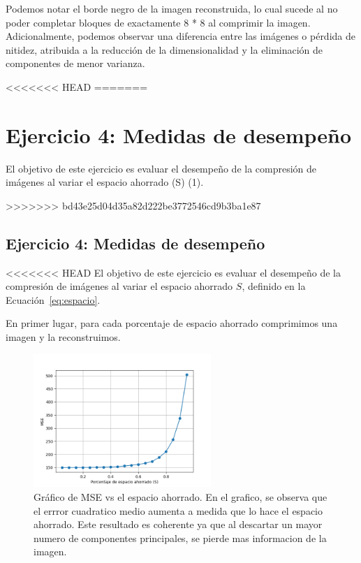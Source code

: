 \documentclass[a4paper,12pt]{article}
\begin{document}
Podemos notar el borde negro de la imagen reconstruida, lo cual sucede al no poder completar bloques de exactamente 8 * 8 al comprimir la imagen.
Adicionalmente, podemos observar una diferencia entre las imágenes o pérdida de nitidez, atribuida a la reducción de la dimensionalidad y la eliminación de componentes de menor varianza.

<<<<<<< HEAD
\vspace{0.5em}
=======
\newpage
\section*{Ejercicio 4: Medidas de desempeño}
El objetivo de este ejercicio es evaluar el desempeño de la compresión de imágenes al variar el espacio ahorrado (S) (1). 

\vspace{1em}
>>>>>>> bd43e25d04d35a82d222be3772546cd9b3ba1e87

\subsection*{Ejercicio 4: Medidas de desempeño}

<<<<<<< HEAD
El objetivo de este ejercicio es evaluar el desempeño de la compresión de imágenes al variar el espacio ahorrado $S$, definido en la Ecuación~\ref{eq:espacio}.

En primer lugar, para cada porcentaje de espacio ahorrado comprimimos una imagen y la reconstruimos.

\begin{figure}[H]
    \centering
    \includegraphics[width=0.6\textwidth]{Ejercicio 4a.png}
    \caption{Gráfico de MSE vs el espacio ahorrado. En el grafico, se observa que el errror cuadratico medio aumenta a 
    medida que lo hace el espacio ahorrado. Este resultado es coherente ya que al descartar un mayor numero de componentes principales, 
    se pierde mas informacion de la imagen.}
    \label{fig:ej4}
\end{figure}
\end{document}

